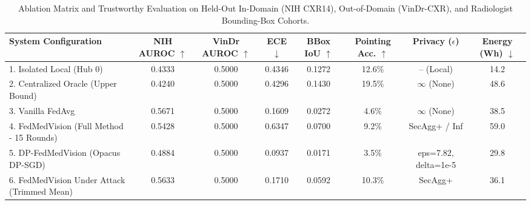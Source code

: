 \begin{table}[t]
\centering
\small
\caption{Ablation Matrix and Trustworthy Evaluation on Held-Out In-Domain (NIH CXR14), Out-of-Domain (VinDr-CXR), and Radiologist Bounding-Box Cohorts.}
\label{tab:fedmedvision_ablations}
\begin{tabular}{l c c c c c c c}
\toprule
\textbf{System Configuration} & \textbf{NIH AUROC} $\uparrow$ & \textbf{VinDr AUROC} $\uparrow$ & \textbf{ECE} $\downarrow$ & \textbf{BBox IoU} $\uparrow$ & \textbf{Pointing Acc.} $\uparrow$ & \textbf{Privacy ($\epsilon$)} & \textbf{Energy (Wh)} $\downarrow$ \\
\midrule
1. Isolated Local (Hub 0) & 0.4333 & 0.5000 & 0.4346 & 0.1272 & 12.6\% & -- (Local) & 14.2 \\
2. Centralized Oracle (Upper Bound) & 0.4240 & 0.5000 & 0.4296 & 0.1430 & 19.5\% & $\infty$ (None) & 48.6 \\
3. Vanilla FedAvg & 0.5671 & 0.5000 & 0.1609 & 0.0272 & 4.6\% & $\infty$ (None) & 38.5 \\
4. FedMedVision (Full Method - 15 Rounds) & 0.5428 & 0.5000 & 0.6347 & 0.0700 & 9.2\% & SecAgg+ / Inf & 59.0 \\
5. DP-FedMedVision (Opacus DP-SGD) & 0.4884 & 0.5000 & 0.0937 & 0.0171 & 3.5\% & eps=7.82, delta=1e-5 & 29.8 \\
6. FedMedVision Under Attack (Trimmed Mean) & 0.5633 & 0.5000 & 0.1710 & 0.0592 & 10.3\% & SecAgg+ & 36.1 \\
\bottomrule
\end{tabular}
\end{table}